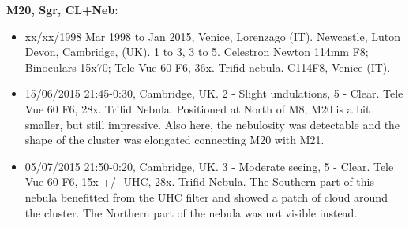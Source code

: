 {\bf M20, Sgr, CL+Neb}:
\begin{itemize}
\item xx/xx/1998 Mar 1998 to Jan 2015, Venice, Lorenzago (IT). Newcastle, Luton Devon, Cambridge, (UK). 1 to 3, 3 to 5. Celestron Newton 114mm F8; Binoculars 15x70; Tele Vue 60 F6, 36x. Trifid nebula. C114F8, Venice (IT).
\item 15/06/2015 21:45-0:30, Cambridge, UK. 2 - Slight undulations, 5 - Clear. Tele Vue 60 F6, 28x. Trifid Nebula. Positioned at North of M8, M20 is a bit smaller, but still impressive. Also here, the nebulosity was detectable and the shape of the cluster was elongated connecting M20 with M21.
\item 05/07/2015 21:50-0:20, Cambridge, UK. 3 - Moderate seeing, 5 - Clear. Tele Vue 60 F6, 15x +/- UHC, 28x. Trifid Nebula. The Southern part of this nebula benefitted from the UHC filter and showed a patch of cloud around the cluster. The Northern part of the nebula was not visible instead. 
\end{itemize}
